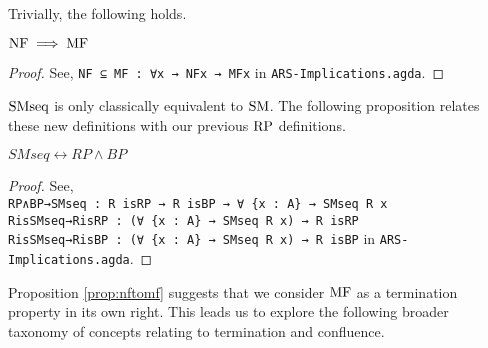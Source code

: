 Trivially, the following holds. 
\begin{proposition}\label{prop:nftomf}
    $\mathrm{NF} \implies \mathrm{MF}$ 
\end{proposition}    
\begin{proof}
    See, \verb|NF ⊆ MF : ∀x → NFx → MFx| in \texttt{ARS-Implications.agda}.
\end{proof}

$\mathrm{SMseq}$ is only classically equivalent to $\mathrm{SM}$. The 
following proposition relates these new definitions with our previous $\mathrm{RP}$ definitions.
\begin{proposition}\label{prop:SMRP}
    $SMseq \leftrightarrow RP \land BP$
\end{proposition}
\begin{proof}
    See,\\ \verb|RP∧BP→SMseq : R isRP → R isBP → ∀ {x : A} → SMseq R x| \\ \verb|RisSMseq→RisRP : (∀ {x : A} → SMseq R x) → R isRP|
    \\ \verb|RisSMseq→RisBP : (∀ {x : A} → SMseq R x) → R isBP| in \texttt{ARS-Implications.agda}.
\end{proof}


Proposition \ref{prop:nftomf} suggests that we consider $\mathrm{MF}$ as a termination property in its own right. This leads us to 
explore the following broader taxonomy of concepts relating to termination and confluence.

